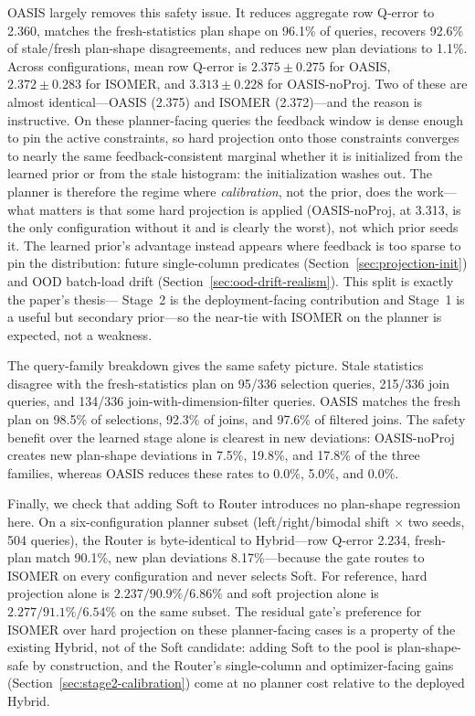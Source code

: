 \documentclass[preprint,12pt]{elsarticle}
\begin{document}
OASIS largely removes this safety issue. It reduces aggregate row
Q-error to 2.360, matches the fresh-statistics plan shape on 96.1\% of queries,
recovers 92.6\% of stale/fresh plan-shape disagreements, and reduces new plan
deviations to 1.1\%. Across configurations, mean row Q-error is
$2.375\pm0.275$ for OASIS, $2.372\pm0.283$ for ISOMER, and
$3.313\pm0.228$ for OASIS-noProj. Two of these are almost identical---OASIS
(2.375) and ISOMER (2.372)---and the reason is instructive. On
these planner-facing queries the feedback window is dense enough to pin the
active constraints, so hard projection onto those constraints converges to nearly
the same feedback-consistent marginal whether it is initialized from the learned
prior or from the stale histogram: the initialization washes out. The planner is
therefore the regime where \emph{calibration}, not the prior, does the work---what
matters is that some hard projection is applied (OASIS-noProj, at 3.313, is the
only configuration without it and is clearly the worst), not which prior seeds it.
The learned prior's advantage instead appears where feedback is too sparse to pin
the distribution: future single-column predicates
(Section~\ref{sec:projection-init}) and OOD batch-load drift
(Section~\ref{sec:ood-drift-realism}). This split is exactly the paper's thesis---
Stage~2 is the deployment-facing contribution and Stage~1 is a useful but
secondary prior---so the near-tie with ISOMER on the planner is expected, not a
weakness.

The query-family breakdown gives the same safety picture. Stale statistics
disagree with the fresh-statistics plan
on 95/336 selection queries, 215/336 join queries, and 134/336
join-with-dimension-filter queries. OASIS matches the fresh plan on
98.5\% of selections, 92.3\% of joins, and 97.6\% of filtered joins. The
safety benefit over the learned stage alone is clearest in new deviations:
OASIS-noProj creates new plan-shape deviations in 7.5\%, 19.8\%, and 17.8\% of
the three families, whereas OASIS reduces these rates to 0.0\%, 5.0\%,
and 0.0\%.

Finally, we check that adding Soft to Router introduces no plan-shape regression
here. On a six-configuration
planner subset (left/right/bimodal shift $\times$ two seeds, 504 queries), the
Router is byte-identical to Hybrid---row Q-error
2.234, fresh-plan match 90.1\%, new plan deviations 8.17\%---because the gate
routes to ISOMER on every configuration and never selects Soft. For reference,
hard projection alone is $2.237/90.9\%/6.86\%$ and soft projection alone is
$2.277/91.1\%/6.54\%$ on the same subset. The residual gate's preference for
ISOMER over hard projection on these planner-facing cases is a property of the
existing Hybrid, not of the Soft candidate: adding Soft to the pool is
plan-shape-safe by construction, and the Router's single-column and
optimizer-facing gains (Section~\ref{sec:stage2-calibration}) come at no planner
cost relative to the deployed Hybrid.
\end{document}
